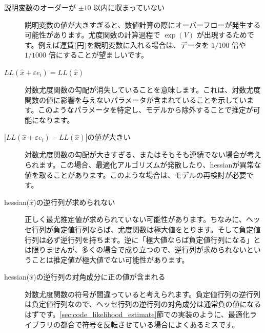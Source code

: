\begin{description}
    \item[説明変数のオーダーが $\pm 10$ 以内に収まっていない] 説明変数の値が大きすぎると、数値計算の際にオーバーフローが発生する可能性があります。尤度関数の計算過程で $\exp(V)$ が出現するためです。例えば運賃(円)を説明変数に入れる場合は、データを $1/100$ 倍や $1/1000$ 倍にすることが望ましいです。
    \item[$LL(\hat x + \varepsilon e_i)=LL(\hat x)$] 対数尤度関数の勾配が消失していることを意味します。これは、対数尤度関数の値に影響を与えないパラメータが含まれていることを示しています。このようなパラメータを特定し、モデルから除外することで推定が可能になります。
    \item[$|LL(\hat x + \varepsilon e_i)-LL(\hat x)|$の値が大きい] 対数尤度関数の勾配が大きすぎる、またはそもそも連続でない場合が考えられます。この場合、最適化アルゴリズムが発散したり、hessianが異常な値を取ることがあります。このような場合は、モデルの再検討が必要です。
    \item[hessian($\hat x$)の逆行列が求められない] 正しく最尤推定値が求められていない可能性があります。ちなみに、ヘッセ行列が負定値行列ならば、尤度関数は極大値をとります。そして負定値行列は必ず逆行列を持ちます。逆に「極大値ならば負定値行列になる」とは限りませんが、多くの場合で成り立つので、逆行列が求められないということは推定値が極大値でない可能性があります。
    \item[hessian($\hat x$)の逆行列の対角成分に正の値が含まれる] 対数尤度関数の符号が間違っていると考えられます。負定値行列の逆行列は負定値行列なので、ヘッセ行列の逆行列の対角成分は通常負の値になるはずです。\ref{sec:code_likelihood_estimate}節での実装のように、最適化ライブラリの都合で符号を反転させている場合によくあるミスです。
\end{description}
